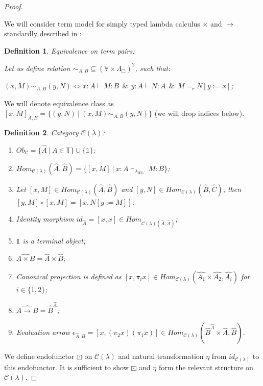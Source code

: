 \documentclass[a4paper]{article}
\newtheorem{defin}{Definition}
\begin{document}
\begin{proof}

$ $

We will consider term model for simply typed lambda calculus $\times$ and $\to$ standardly described in \cite{LambekScott}:

\begin{defin} Equivalence on term pairs:
  $ $

  Let us define relation $\sim_{A, B} \subseteq (\mathbb{V} \times \Lambda_{\Box})^2$, such that:

  $(x, M) \sim_{A, B} (y, N) \Leftrightarrow x : A \vdash M : B \:\: \& \:\: y : A \vdash N : A \:\: \& \:\: M =_r N [y := x]$;
\end{defin}

We will denote equivalence class as $[x, M]_{A, B} = \{ (y, N) \: | \: (x, M) \sim_{A, B} (y, N) \}$ (we will drop indices below).


\begin{defin} Category $\mathcal{C}(\lambda)$:
\begin{enumerate}
  \item $Ob_{\mathcal{C}} = \{ \hat{A} \: | \: A \in \mathbb{T} \} \cup \{ \mathds{1} \}$;
  \item $Hom_{\mathcal{C}(\lambda)}(\hat{A},\hat{B}) = \{ [x, M] \: | \: x : A \vdash_{\lambda_{\text{IEL}^{-}}} M : B \}$;
  \item Let $[x, M] \in Hom_{\mathcal{C}(\lambda)}(\hat{A},\hat{B})$ and $[y,N] \in Hom_{\mathcal{C}(\lambda)}(\hat{B},\hat{C})$, then $[y,M] \circ [x, M] = [x, N [y := M]]$;
  \item Identity morphism $id_{\hat{A}} = [x,x] \in Hom_{\mathcal{C}(\lambda)(\hat{A}, \hat{A})}$;
  \item $\mathds{1}$ is a terminal object;
  \item $\widehat{A \times B} = \hat{A} \times \hat{B}$;
  \item Canonical projection is defined as $[x, \pi_i x] \in Hom_{\mathcal{C}(\lambda)}(\hat{A_1} \times \hat{A_2},\hat{A_i})$ for $i \in \{ 1, 2 \}$;
  \item $\widehat{A \to B} = \hat{B}^{\hat{A}}$;
  \item Evaluation arrow $\epsilon_{\hat{A},\hat{B}} = [x, (\pi_2 x) (\pi_1 x)] \in Hom_{\mathcal{C}(\lambda)}(\hat{B}^{\hat{A}} \times \hat{A}, \hat{B})$.
\end{enumerate}
\end{defin}

We define endofunctor $\boxdot$ on $\mathcal{C}(\lambda)$ and natural transformation $\eta$ from $id_{\mathcal{C}(\lambda)}$ to this endofunctor.
It is sufficient to show $\boxdot$ and $\eta$ form the relevant structure on $\mathcal{C}(\lambda)$.


\end{proof}
\end{document}
